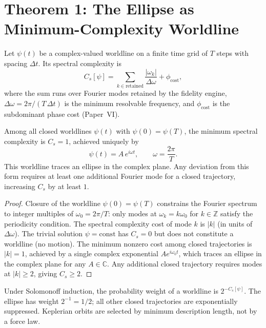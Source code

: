 \documentclass[11pt]{article}
\begin{document}
\section{Theorem 1: The Ellipse as Minimum-Complexity Worldline}
\label{sec:worldline}

\begin{definition}
Let $\psi(t)$ be a complex-valued worldline on a finite time grid of
$T$ steps with spacing $\Delta t$.
Its spectral complexity is
\[
  C_s[\psi] = \sum_{k \in \mathrm{retained}}
  \frac{|\omega_k|}{\Delta\omega} + \phi_{\mathrm{cost}},
\]
where the sum runs over Fourier modes retained by the fidelity engine,
$\Delta\omega = 2\pi/(T\,\Delta t)$ is the minimum resolvable frequency,
and $\phi_{\mathrm{cost}}$ is the subdominant phase cost (Paper~VI).
\end{definition}

\begin{theorem}
\label{thm:ellipse}
Among all closed worldlines $\psi(t)$ with $\psi(0) = \psi(T)$, the
minimum spectral complexity is $C_s = 1$, achieved uniquely by
\[
  \psi(t) = A\,e^{i\omega t}, \qquad \omega = \frac{2\pi}{T}.
\]
This worldline traces an ellipse in the complex plane.
Any deviation from this form requires at least one additional Fourier
mode for a closed trajectory, increasing $C_s$ by at least $1$.
\end{theorem}

\begin{proof}
Closure of the worldline $\psi(0) = \psi(T)$ constrains the Fourier
spectrum to integer multiples of $\omega_0 = 2\pi/T$: only modes at
$\omega_k = k\omega_0$ for $k \in \mathbb{Z}$ satisfy the periodicity
condition.
The spectral complexity cost of mode $k$ is $|k|$ (in units of
$\Delta\omega$).
The trivial solution $\psi = \mathrm{const}$ has $C_s = 0$ but does not
constitute a worldline (no motion).
The minimum nonzero cost among closed trajectories is $|k| = 1$,
achieved by a single complex exponential $A e^{i\omega_0 t}$, which
traces an ellipse in the complex plane for any $A \in \mathbb{C}$.
Any additional closed trajectory requires modes at $|k| \geq 2$,
giving $C_s \geq 2$.
\end{proof}

\begin{corollary}
Under Solomonoff induction, the probability weight of a worldline is
$2^{-C_s[\psi]}$.
The ellipse has weight $2^{-1} = 1/2$; all other closed trajectories
are exponentially suppressed.
Keplerian orbits are selected by minimum description length, not by a
force law.
\end{corollary}
\end{document}
